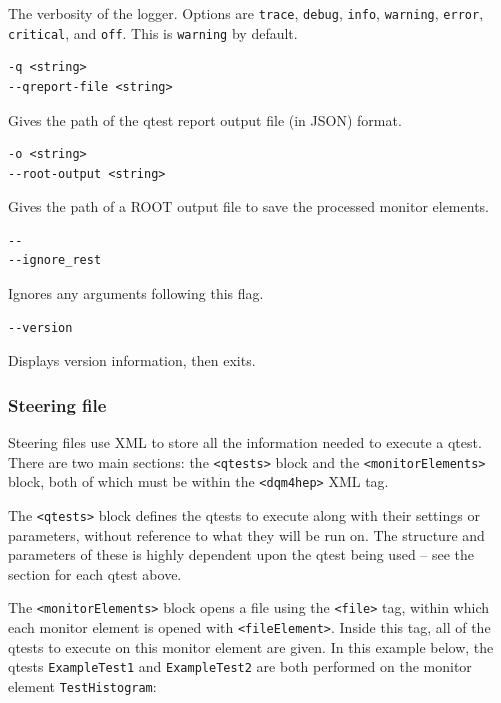 The verbosity of the logger. Options are \texttt{trace}, \texttt{debug}, \texttt{info}, \texttt{warning}, \texttt{error}, \texttt{critical}, and \texttt{off}. This is \texttt{warning} by default.

\begin{lstlisting}
-q <string>
--qreport-file <string>
\end{lstlisting}

Gives the path of the \acrshort{qtest} report output file (in \acrshort{JSON}) format.

\begin{lstlisting}
-o <string>
--root-output <string>
\end{lstlisting}

Gives the path of a ROOT output file to save the processed monitor elements.

\begin{lstlisting}
--
--ignore_rest
\end{lstlisting}

Ignores any arguments following this flag.

\begin{lstlisting}
--version
\end{lstlisting}

Displays version information, then exits.

\subsubsection{Steering file}
Steering files use \acrshort{XML} to store all the information needed to execute a \acrshort{qtest}. There are two main sections: the \texttt{<qtests>} block and the \texttt{<monitorElements>} block, both of which must be within the \texttt{<dqm4hep>} XML tag.

The \texttt{<qtests>} block defines the \acrshort{qtest}s to execute along with their settings or parameters, without reference to what they will be run on. The structure and parameters of these is highly dependent upon the \acrshort{qtest} being used – see the section for each \acrshort{qtest} above.

The \texttt{<monitorElements>} block opens a file using the \texttt{<file>} tag, within which each monitor element is opened with \texttt{<fileElement>}. Inside this tag, all of the \acrshort{qtest}s to execute on this monitor element are given. In this example below, the \acrshort{qtest}s \texttt{ExampleTest1} and \texttt{ExampleTest2} are both performed on the monitor element \texttt{TestHistogram}:

